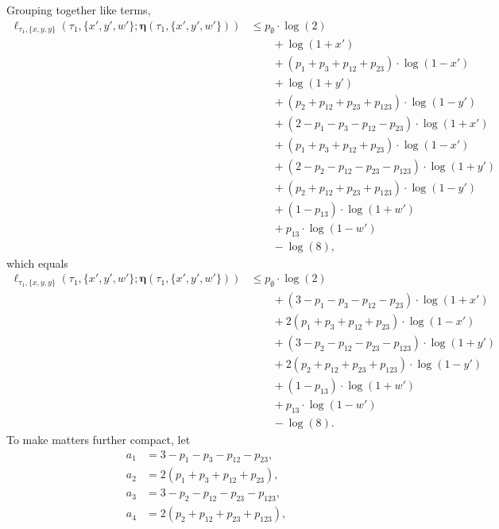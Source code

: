 \documentclass{article}
\newcommand{\fullAncestralSplitPartitions}{\boldsymbol\eta}
\begin{document}
Grouping together like terms,
\begin{align*}
    \ell_{\tau_1,\{x,y,y\}}(\tau_1, \{x',y',w'\}; \fullAncestralSplitPartitions(\tau_1,\{x',y',w'\}))
    &\le      p_{\emptyset}  \cdot\log(2) \\
    &\qquad + \log(1+x') \\
    &\qquad + (p_{1}+p_{3}+p_{12}+p_{23})\cdot\log(1-x') \\
    &\qquad + \log(1+y') \\
    &\qquad + (p_{2}+p_{12}+p_{23}+p_{123})\cdot\log(1-y') \\
    &\qquad + (2-p_{1}-p_{3}-p_{12}-p_{23})\cdot\log(1+x') \\
    &\qquad + (p_{1}+p_{3}+p_{12}+p_{23})\cdot\log(1-x') \\
    &\qquad + (2-p_{2}-p_{12}-p_{23}-p_{123})\cdot\log(1+y') \\
    &\qquad + (p_{2}+p_{12}+p_{23}+p_{123})\cdot\log(1-y') \\
    &\qquad + (1-p_{13})\cdot\log(1+w') \\
    &\qquad + p_{13}\cdot\log(1-w') \\
    &\qquad - \log(8),
\end{align*}
which equals
\begin{align*}
    \ell_{\tau_1,\{x,y,y\}}(\tau_1, \{x',y',w'\}; \fullAncestralSplitPartitions(\tau_1,\{x',y',w'\}))
    &\le      p_{\emptyset}  \cdot\log(2) \\
    &\qquad + (3-p_{1}-p_{3}-p_{12}-p_{23})\cdot\log(1+x') \\
    &\qquad + 2(p_{1}+p_{3}+p_{12}+p_{23})\cdot\log(1-x') \\
    &\qquad + (3-p_{2}-p_{12}-p_{23}-p_{123})\cdot\log(1+y') \\
    &\qquad + 2(p_{2}+p_{12}+p_{23}+p_{123})\cdot\log(1-y') \\
    &\qquad + (1-p_{13})\cdot\log(1+w') \\
    &\qquad + p_{13}\cdot\log(1-w') \\
    &\qquad - \log(8).
\end{align*}
To make matters further compact, let
\begin{equation}
    \begin{aligned}
        a_{1} &= 3-p_{1}-p_{3}-p_{12}-p_{23}, \\
        a_{2} &= 2(p_{1}+p_{3}+p_{12}+p_{23}), \\
        a_{3} &= 3-p_{2}-p_{12}-p_{23}-p_{123}, \\
        a_{4} &= 2(p_{2}+p_{12}+p_{23}+p_{123}), \\
    \end{aligned}
    \label{eq:a_const}
\end{equation}
\end{document}
